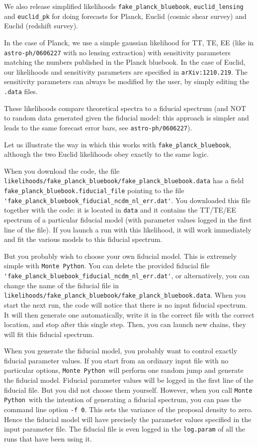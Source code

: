 \documentclass[10pt]{article}
\newcommand{\MP}{\texttt{Monte Python}}
\begin{document}
We also release simplified likelihoods \verb?fake_planck_bluebook?, \verb?euclid_lensing? and \verb?euclid_pk? for doing forecasts for Planck, Euclid (cosmic shear survey) and Euclid (redshift survey).

In the case of Planck, we use a simple gaussian likelihood for TT, TE, EE (like in \verb?astro-ph/0606227? with no lensing extraction) with sensitivity parameters matching the numbers published in the Planck bluebook. In the case of Euclid, our likelihoods and sensitivity parameters are specified in \verb?arXiv:1210.219?. The sensitivity parameters can always be modified by the user, by simply editing the \verb?.data? files.

These likelihoods compare theoretical spectra to a fiducial spectrum (and NOT to random data generated given the fiducial model: this approach is simpler and leads to the same forecast error bars, see \verb?astro-ph/0606227?).

Let us illustrate the way in which this works with \verb?fake_planck_bluebook?, although the two Euclid likelihoods obey exactly to the same logic.


When you download the code, the file \verb?likelihoods/fake_planck_bluebook/fake_planck_bluebook.data? has a field
\verb?fake_planck_bluebook.fiducial_file? pointing to the file\\ \verb?'fake_planck_bluebook_fiducial_ncdm_nl_err.dat'?. You downloaded this file together with the code: it is located in \verb?data? and it contains the TT/TE/EE spectrum of a particular fiducial model (with parameter values logged in the first line of the file). If you launch a run with this likelihood, it will work immediately and fit the various models to this fiducial spectrum.

But you probably wish to choose your own fiducial model. This is extremely simple with \MP. You can delete the provided fiducial file\\\verb?'fake_planck_bluebook_fiducial_ncdm_nl_err.dat'?, or alternatively, you can change the name of the fiducial file in\\ \verb?likelihoods/fake_planck_bluebook/fake_planck_bluebook.data?. When you start the next run, the code will notice that there is no input fiducial spectrum. It will then generate one automatically, write it in the correct file with the correct location, and stop after this single step. Then, you can launch new chains, they will fit this fiducial spectrum. 

When you generate the fiducial model, you probably want to control exactly fiducial parameter values. If you start from an ordinary input file with no particular options, \MP~will perform one random jump and generate the fiducial model. Fiducial parameter values will be logged in the first line of the fiducial file. But you did not choose them yourself. However, when you call \MP~with the intention of generating a fiducial spectrum, you can pass the command line option \verb?-f 0?. This sets the variance of the proposal density to zero. Hence the fiducial model will have precisely the parameter values specified in the input parameter file. The fiducial file is even logged in the \verb?log.param? of all the runs that have been using it.
\end{document}
